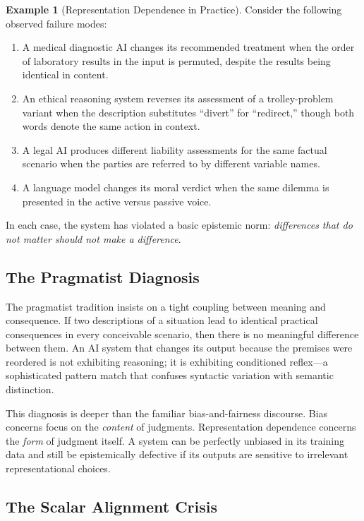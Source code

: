 \documentclass[12pt,letterpaper]{article}
\theoremstyle{definition}
\newtheorem{example}[theorem]{Example}
\theoremstyle{plain}
\begin{document}
\begin{example}[Representation Dependence in Practice]
\label{ex:rep-dep}
Consider the following observed failure modes:
\begin{enumerate}[label=(\alph*)]
    \item A medical diagnostic AI changes its recommended treatment when the order of laboratory results in the input is permuted, despite the results being identical in content.
    \item An ethical reasoning system reverses its assessment of a trolley-problem variant when the description substitutes ``divert'' for ``redirect,'' though both words denote the same action in context.
    \item A legal AI produces different liability assessments for the same factual scenario when the parties are referred to by different variable names.
    \item A language model changes its moral verdict when the same dilemma is presented in the active versus passive voice.
\end{enumerate}
In each case, the system has violated a basic epistemic norm: \emph{differences that do not matter should not make a difference}.
\end{example}

\subsection{The Pragmatist Diagnosis}

The pragmatist tradition insists on a tight coupling between meaning and consequence. If two descriptions of a situation lead to identical practical consequences in every conceivable scenario, then there is no meaningful difference between them. An AI system that changes its output because the premises were reordered is not exhibiting reasoning; it is exhibiting conditioned reflex---a sophisticated pattern match that confuses syntactic variation with semantic distinction.

This diagnosis is deeper than the familiar bias-and-fairness discourse. Bias concerns focus on the \emph{content} of judgments. Representation dependence concerns the \emph{form} of judgment itself. A system can be perfectly unbiased in its training data and still be epistemically defective if its outputs are sensitive to irrelevant representational choices.

\subsection{The Scalar Alignment Crisis}
\end{document}
